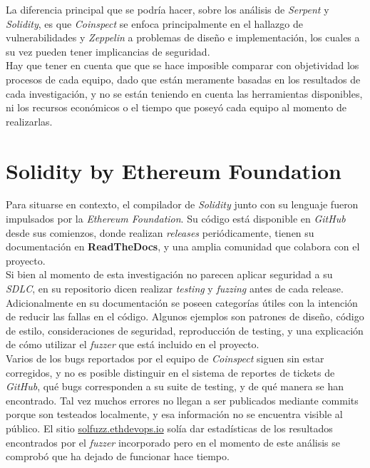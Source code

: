 La diferencia principal que se podría hacer, sobre los análisis de \textit{Serpent} y \textit{Solidity}, es que \textit{Coinspect} se enfoca principalmente en el hallazgo de vulnerabilidades y \textit{Zeppelin} a problemas de diseño e implementación, los cuales a su vez pueden tener implicancias de seguridad.\\

Hay que tener en cuenta que que se hace imposible comparar con objetividad los procesos de cada equipo, dado que están meramente basadas en los resultados de cada investigación, y no se están teniendo en cuenta las herramientas disponibles, ni los recursos económicos o el tiempo que poseyó cada equipo al momento de realizarlas.\\

\section{Solidity by Ethereum Foundation}

Para situarse en contexto, el compilador de \textit{Solidity} junto con su lenguaje fueron impulsados por la \textit{Ethereum Foundation}. Su código está disponible en \textit{GitHub}\cite{SolidityGitHub} desde sus comienzos, donde realizan \textit{releases} periódicamente, tienen su documentación en \textbf{ReadTheDocs}\cite{ReadTheDocsSolidity}, y una amplia comunidad que colabora con el proyecto.\\

Si bien al momento de esta investigación no parecen aplicar seguridad a su \textit{SDLC}, en su repositorio dicen realizar \textit{testing} y \textit{fuzzing} antes de cada release. Adicionalmente en su documentación se poseen categorías útiles con la intención de reducir las fallas en el código. Algunos ejemplos son patrones de diseño, código de estilo, consideraciones de seguridad, reproducción de testing, y una explicación de cómo utilizar el \textit{fuzzer} que está incluido en el proyecto.\\

Varios de los bugs reportados por el equipo de \textit{Coinspect} siguen sin estar corregidos, y no es posible distinguir en el sistema de reportes de tickets de \textit{GitHub}, qué bugs corresponden a su suite de testing, y de qué manera se han encontrado. Tal vez muchos errores no llegan a ser publicados mediante commits porque son testeados localmente, y esa información no se encuentra visible al público. El sitio \url{solfuzz.ethdevops.io}\cite{SolfuzzSite} solía dar estadísticas de los resultados encontrados por el \textit{fuzzer} incorporado pero en el momento de este análisis se comprobó que ha dejado de funcionar hace tiempo.\\

